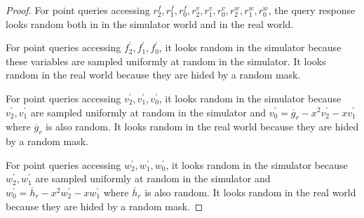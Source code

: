 \begin{proof}
For point queries accessing $r_2^f, r_1^f, r_0^f, r_2^v, r_1^v, r_0^v, r_2^w, r_1^w, r_0^w$, the query response looks random both in in the simulator world and in the real world.

For point queries accessing $f_2^\prime, f_1^\prime, f_0^\prime$, it looks random in the simulator because these variables are sampled uniformly at random in the simulator. It looks random in the real world because they are hided by a random mask.

For point queries accessing $v_2^\prime, v_1^\prime, v_0^\prime$, it looks random in the simulator because $v_2^\prime, v_1^\prime$ are sampled uniformly at random in the simulator and $v_0^\prime = \overline{g}_r - x^2 v_2^\prime - x v_1^\prime$ where $\overline{g}_r$ is also random. It looks random in the real world because they are hided by a random mask.

For point queries accessing $w_2^\prime, w_1^\prime, w_0^\prime$, it looks random in the simulator because $w_2^\prime, w_1^\prime$ are sampled uniformly at random in the simulator and $w_0^\prime = \overline{h}_r - x^2 w_2^\prime - x w_1^\prime$ where $\overline{h}_r$ is also random. It looks random in the real world because they are hided by a random mask.

\end{proof}
